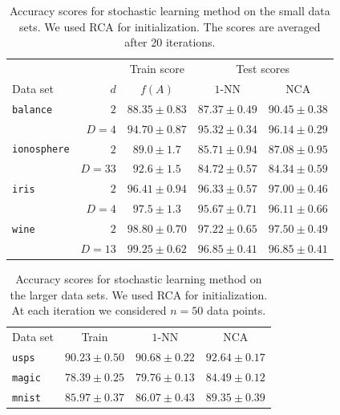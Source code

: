     \begin{table}
      \centering\begin{tabular}{lrccc}
      \toprule
	      &     & Train score  & \multicolumn{2}{c}{Test scores}\\
      \cmidrule(r){3-3} \cmidrule(r){4-5}
      Data set & $d$ & $f(A)$ & $1$-NN & NCA \\
      \midrule
	\texttt{balance}&$2$&$88.35 \pm 0.83$&$87.37 \pm 0.49$&$90.45 \pm 0.38$\\  
	&$D=4$&$94.70 \pm 0.87$&$95.32 \pm 0.34$&$96.14 \pm 0.29$\\ 
	\midrule
	\texttt{ionosphere}&$2$&$89.0 \pm 1.7$&$85.71 \pm 0.94$&$87.08 \pm 0.95$\\
	&$D=33$&$92.6 \pm 1.5$&$84.72 \pm 0.57$&$84.34 \pm 0.59$\\ 
	\midrule
	\texttt{iris}&$2$&$96.41 \pm 0.94$&$96.33 \pm 0.57$&$97.00 \pm 0.46$\\ 
	&$D=4$&$97.5 \pm 1.3$&$95.67 \pm 0.71$&$96.11 \pm 0.66$\\ 
	\midrule
	\texttt{wine}&$2$&$98.80 \pm 0.70$&$97.22 \pm 0.65$&$97.50 \pm 0.49$\\ 
	&$D=13$&$99.25 \pm 0.62$&$96.85 \pm 0.41$&$96.85 \pm 0.41$\\ 
      \bottomrule
      \end{tabular}
      \caption[Accuracy for the stochastic learning method on small data sets]{Accuracy scores for stochastic learning method on the small data sets. We used RCA for initialization. The scores are averaged after 20 iterations.}
    \label{tab:sl-1}
    \end{table}

        \begin{table}
            	\centering
            	\begin{tabular}{lccc}
            	\toprule
            	Data set & Train & $1$-NN & NCA \\
            	\cmidrule(r){2-2}\cmidrule(r){3-4}
            	\texttt{usps}&$90.23  \pm 0.50$&$90.68 \pm 0.22$&$92.64 \pm 0.17$\\
            	\texttt{magic}&$78.39 \pm 0.25$&$79.76 \pm 0.13$&$84.49 \pm 0.12$\\
            	\texttt{mnist}&$85.97 \pm 0.37$&$86.07 \pm 0.43$&$89.35 \pm 0.39$\\
            	 \bottomrule
            	\end{tabular}
		\caption[Accuracy for the  stochastic learning method on large data sets]{Accuracy scores for stochastic learning method on the larger data sets. We used RCA for initialization. At each iteration we considered $n=50$ data points.}
		\label{tab:sl-2}
        \end{table}


